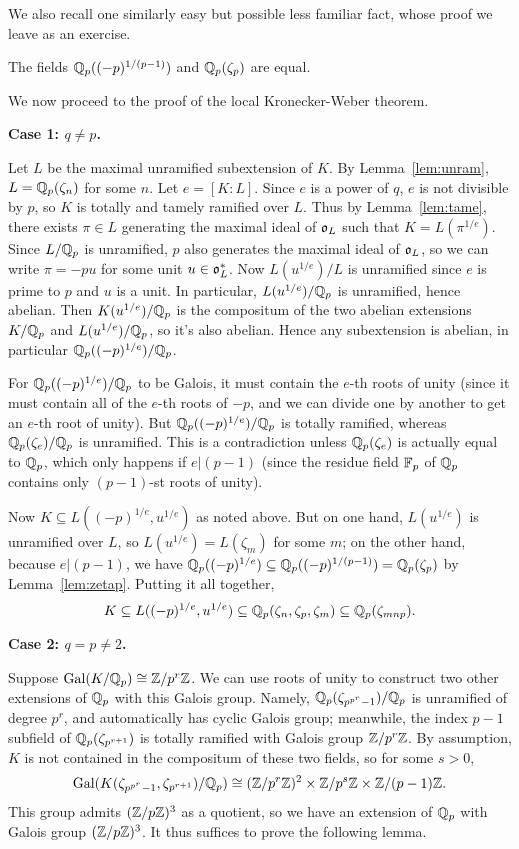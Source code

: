 We also recall one similarly easy but possible less familiar fact, whose proof we leave as an exercise.
\begin{lemma} \label{lem:zetap}
The fields $\mathbb{Q}_p((-p)^{1/(p-1)})$ and $\mathbb{Q}_p(\zeta_p)$ are equal.
\end{lemma}

We now proceed to the proof of the local Kronecker-Weber theorem.

\noindent
\textbf{Case 1: $q \neq p$.}

Let $L$ be the maximal unramified subextension of $K$. By
Lemma~\ref{lem:unram}, $L = \mathbb{Q}_p(\zeta_n)$ for some $n$.
Let $e = [K:L]$. Since $e$ is a power of $q$, $e$ is not divisible by $p$,
so $K$ is totally and tamely ramified over $L$. Thus by Lemma~\ref{lem:tame},
there exists $\pi \in L$ generating the maximal ideal of $\mathfrak{o}_L$ such 
that $K = L(\pi^{1/e})$.
Since $L/\mathbb{Q}_p$ is unramified, $p$ also generates the maximal ideal of
$\mathfrak{o}_L$, so we can write $\pi = -pu$ for some unit $u \in \mathfrak{o}_L^*$.
Now $L(u^{1/e})/L$ is unramified since $e$ is prime to $p$ and $u$ is a unit.
In particular, $L(u^{1/e})/\mathbb{Q}_p$ is unramified, hence abelian. Then
$K(u^{1/e})/\mathbb{Q}_p$ is the compositum of the two abelian extensions
$K/\mathbb{Q}_p$ and $L(u^{1/e})/\mathbb{Q}_p$, so it's also abelian. Hence any subextension
is abelian, in particular $\mathbb{Q}_p((-p)^{1/e})/\mathbb{Q}_p$.

For $\mathbb{Q}_p((-p)^{1/e})/\mathbb{Q}_p$ to be Galois, it must contain the $e$-th roots
of unity (since it must contain all of the $e$-th roots of $-p$, and we
can divide one by another to get an $e$-th root of unity). But
$\mathbb{Q}_p((-p)^{1/e})/\mathbb{Q}_p$ is totally ramified, whereas $\mathbb{Q}_p(\zeta_e)/\mathbb{Q}_p$
is unramified. This is a contradiction unless $\mathbb{Q}_p(\zeta_e)$ is actually
equal to $\mathbb{Q}_p$, which only happens if $e|(p-1)$ (since the residue field
$\mathbb{F}_p$ of $\mathbb{Q}_p$ contains only $(p-1)$-st roots of unity).

Now $K \subseteq L((-p)^{1/e}, u^{1/e})$ as noted above. But on one hand, $L(u^{1/e})$
is unramified over $L$, so $L(u^{1/e}) = L(\zeta_m)$ for some $m$; on the
other hand, because $e|(p-1)$, we have
$\mathbb{Q}_p((-p)^{1/e}) \subseteq \mathbb{Q}_p((-p)^{1/(p-1)}) =
\mathbb{Q}_p(\zeta_p)$ by Lemma~\ref{lem:zetap}.
Putting it all together,
\[
K \subseteq L((-p)^{1/e}, u^{1/e}) \subseteq \mathbb{Q}_p(\zeta_n, \zeta_p, \zeta_m)
\subseteq \mathbb{Q}_p(\zeta_{mnp}).
\]

\noindent
\textbf{Case 2: $q = p \neq 2$.}

Suppose $\operatorname{Gal}(K/\mathbb{Q}_p) \cong \mathbb{Z}/p^r\mathbb{Z}$. We can use roots of unity to
construct two other extensions of $\mathbb{Q}_p$ with this Galois group. Namely,
$\mathbb{Q}_{p}(\zeta_{p^{p^r}-1})/\mathbb{Q}_p$ is unramified of degree $p^r$, and 
automatically has cyclic Galois group; meanwhile, the index $p-1$ subfield
of $\mathbb{Q}_p(\zeta_{p^{r+1}})$ is totally ramified with Galois group $\mathbb{Z}/p^r\mathbb{Z}$.
By assumption, $K$ is not contained in the compositum of these two fields,
so for some $s>0$,
\[
\operatorname{Gal}(K(\zeta_{p^{p^r}-1}, \zeta_{p^{r+1}})/\mathbb{Q}_p) \cong
(\mathbb{Z}/p^r\mathbb{Z})^2 \times \mathbb{Z}/p^s \mathbb{Z} \times \mathbb{Z}/(p-1)\mathbb{Z}.
\]
This group admits
$(\mathbb{Z}/p\mathbb{Z})^3$ as a quotient, so we have an extension of $\mathbb{Q}_p$ with
Galois group $(\mathbb{Z}/p\mathbb{Z})^3$. It thus suffices to prove the following lemma.

